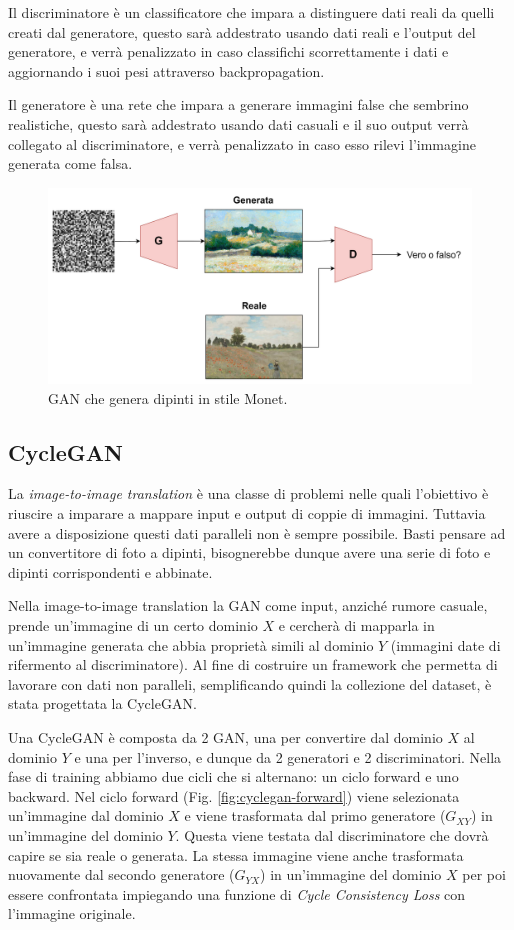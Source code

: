 			Il discriminatore è un classificatore che impara a distinguere dati reali da quelli creati dal generatore, questo sarà addestrato usando dati reali e l'output del generatore, e verrà penalizzato in caso classifichi scorrettamente i dati e aggiornando i suoi pesi attraverso backpropagation.
			
			Il generatore è una rete che impara a generare immagini false che sembrino realistiche, questo sarà addestrato usando dati casuali e il suo output verrà collegato al discriminatore, e verrà penalizzato in caso esso rilevi l'immagine generata come falsa.
			
			\begin{figure}[h]
				\centering
				\includegraphics[width=0.7\linewidth]{figures/gans}
				\caption{GAN che genera dipinti in stile Monet.}
				\label{fig:gans}
			\end{figure}
		
		\subsection{CycleGAN}
			La \textit{image-to-image translation} è una classe di problemi nelle quali l'obiettivo è riuscire a imparare a mappare input e output di coppie di immagini. Tuttavia avere a disposizione questi dati paralleli non è sempre possibile. Basti pensare ad un convertitore di foto a dipinti, bisognerebbe dunque avere una serie di foto e dipinti corrispondenti e abbinate.
			
			Nella image-to-image translation la GAN come input, anziché rumore casuale, prende un'immagine di un certo dominio $X$ e cercherà di mapparla in un'immagine generata che abbia proprietà simili al dominio $Y$ (immagini date di rifermento al discriminatore).
			Al fine di costruire un framework che permetta di lavorare con dati non paralleli, semplificando quindi la collezione del dataset, è stata progettata la CycleGAN\cite{CycleGAN2017}.
			
			Una CycleGAN è composta da 2 GAN, una per convertire dal dominio $X$ al dominio $Y$ e una per l'inverso, e dunque da 2 generatori e 2 discriminatori.
			Nella fase di training abbiamo due cicli che si alternano: un ciclo forward e uno backward. 
			Nel ciclo forward (Fig. \ref{fig:cyclegan-forward}) viene selezionata un'immagine dal dominio $X$ e viene trasformata dal primo generatore ($G_{XY}$) in un'immagine del dominio $Y$. Questa viene testata dal discriminatore che dovrà capire se sia reale o generata. La stessa immagine viene anche trasformata nuovamente dal secondo generatore ($G_{YX}$) in un'immagine del dominio $X$ per poi essere confrontata impiegando una funzione di \textit{Cycle Consistency Loss} con l'immagine originale.

